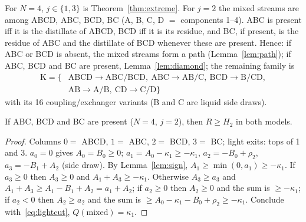 \documentclass[11pt,a4paper]{report}
\begin{document}
For $N=4$, $j\in\{1,3\}$ is Theorem~\ref{thm:extreme}. For $j=2$ the mixed streams are among ABCD, ABC, BCD, BC
(A, B, C, D $=$ components 1--4). ABC is present iff it is the distillate of ABCD, BCD iff it is its residue, and BC, if
present, is the residue of ABC and the distillate of BCD whenever these are present. Hence: if ABC or BCD is absent,
the mixed streams form a path (Lemma~\ref{lem:path}); if ABC, BCD and BC are present, Lemma~\ref{lem:diamond}; the
remaining family is
\[\begin{aligned}\mathrm K=\{&\mathrm{ABCD}\to\mathrm{ABC}/\mathrm{BCD},\ \mathrm{ABC}\to\mathrm{AB}/\mathrm C,\ \mathrm{BCD}\to\mathrm B/\mathrm{CD},\\
&\mathrm{AB}\to\mathrm A/\mathrm B,\ \mathrm{CD}\to\mathrm C/\mathrm D\}\end{aligned}\]
with its 16 coupling/exchanger variants (B and C are liquid side draws).

\begin{lemma}[diamond]\label{lem:diamond}
If ABC, BCD and BC are present ($N=4$, $j=2$), then $R\ge H_2$ in both models.
\end{lemma}
\begin{proof}
Columns $0=$ ABCD, $1=$ ABC, $2=$ BCD, $3=$ BC; light exits: tops of 1 and 3. $a_0=0$ gives $A_0=B_0\ge0$;
$a_1=A_0-\kappa_1\ge-\kappa_1$, $a_2=-B_0+\rho_2$, $a_3=-B_1+A_2$ (side draw). By Lemma~\ref{lem:sign},
$A_1\ge\min(0,a_1)\ge-\kappa_1$. If $a_3\ge0$ then $A_3\ge0$ and $A_1+A_3\ge-\kappa_1$. Otherwise $A_3\ge a_3$ and
$A_1+A_3\ge A_1-B_1+A_2=a_1+A_2$; if $a_2\ge0$ then $A_2\ge0$ and the sum is $\ge-\kappa_1$; if $a_2<0$ then $A_2\ge a_2$ and
the sum is $\ge A_0-\kappa_1-B_0+\rho_2\ge-\kappa_1$. Conclude with~\eqref{eq:lightcut}, $Q(\text{mixed})=\kappa_1$.
\end{proof}
\end{document}
